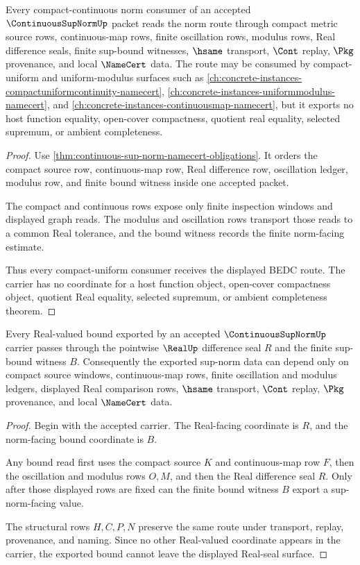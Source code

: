 \begin{theorem}
\label{thm:continuous-sup-norm-compact-uniform-handoff}
Every compact-continuous norm consumer of an accepted $\ContinuousSupNormUp$ packet reads the norm route through compact metric source rows, continuous-map rows, finite oscillation rows, modulus rows, Real difference seals, finite sup-bound witnesses, $\hsame$ transport, $\Cont$ replay, $\Pkg$ provenance, and local $\NameCert$ data. The route may be consumed by compact-uniform and uniform-modulus surfaces such as \autoref{ch:concrete-instances-compactuniformcontinuity-namecert}, \autoref{ch:concrete-instances-uniformmodulus-namecert}, and \autoref{ch:concrete-instances-continuousmap-namecert}, but it exports no host function equality, open-cover compactness, quotient real equality, selected supremum, or ambient completeness.
\end{theorem}
\begin{proof}
Use \autoref{thm:continuous-sup-norm-namecert-obligations}. It orders the compact source row, continuous-map row, Real difference row, oscillation ledger, modulus row, and finite bound witness inside one accepted packet.

The compact and continuous rows expose only finite inspection windows and displayed graph reads. The modulus and oscillation rows transport those reads to a common Real tolerance, and the bound witness records the finite norm-facing estimate.

Thus every compact-uniform consumer receives the displayed BEDC route. The carrier has no coordinate for a host function object, open-cover compactness object, quotient Real equality, selected supremum, or ambient completeness theorem.
\end{proof}

\begin{theorem}
\label{thm:continuous-sup-norm-real-seal-nonescape}
Every Real-valued bound exported by an accepted $\ContinuousSupNormUp$ carrier passes through the pointwise $\RealUp$ difference seal $R$ and the finite sup-bound witness $B$. Consequently the exported sup-norm data can depend only on compact source windows, continuous-map rows, finite oscillation and modulus ledgers, displayed Real comparison rows, $\hsame$ transport, $\Cont$ replay, $\Pkg$ provenance, and local $\NameCert$ data.
\end{theorem}
\begin{proof}
Begin with the accepted carrier. The Real-facing coordinate is $R$, and the norm-facing bound coordinate is $B$.

Any bound read first uses the compact source $K$ and continuous-map row $F$, then the oscillation and modulus rows $O,M$, and then the Real difference seal $R$. Only after those displayed rows are fixed can the finite bound witness $B$ export a sup-norm-facing value.

The structural rows $H,C,P,N$ preserve the same route under transport, replay, provenance, and naming. Since no other Real-valued coordinate appears in the carrier, the exported bound cannot leave the displayed Real-seal surface.
\end{proof}

